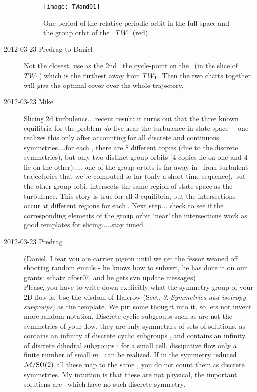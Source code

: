 \begin{description}
\begin{figure}
\begin{center}
  \texttt{[image: TWand01]}
\end{center}
  \caption{
  One period of the relative periodic orbit  in the full
  space and the group orbit of the \reqv\ $TW_{1}$ (red).}
\label{fig:TWand01}
\end{figure}

\item[2012-03-23 Predrag to Daniel]  Not the closest, use as the 2nd
\template\ the cycle-point on the  \po\ (in the slice of
$TW_{1}$) which is the furthest away from $TW_{1}$. Then the
two charts together will give the optimal cover over the whole 
trajectory.

\item[2012-03-23 Mike~~] Slicing 2d turbulence....recent result: it turns
out that the three known equilibria for the problem \emph{do} live near
the turbulence in state space----one realizes this only after accounting
for all discrete and continuous symmetries....for each {\eqv}, there
are 8 different copies (due to the discrete symmetries), but only two
distinct group orbits (4 copies lie on one and 4 lie on the
other)..... one of the group orbits is far away in \statesp\ from
turbulent trajectories that we've computed so far (only a short time
sequence), but the other group orbit intersects the same region of state
space as the turbulence.  This story is true for all 3 equilibria, but
the intersections occur at different regions for each {\eqv}. Next
step... check to see if the corresponding elements of the group orbit
`near' the intersections work as good templates for slicing.....stay
tuned.

\item[2012-03-23 Predrag~~] (Daniel, I fear you are carrier pigeon until
we get the fessor weaned off shooting random emails - he knows how to
subvert, he has done it on our grants: schatz   afosr07, and he gets
svn update messages)
\\
Please, you have to write down explicitly what the symmetry group of your
2D flow is. Use the wisdom of
{Halcrow} (Sect. \emph{3. Symmetries and isotropy subgroups})
as the template. We put some thought into it, so lets not invent more
random notation. Discrete cyclic subgroups such as  are not the
symmetries of your flow, they are only symmetries of sets of solutions,
as  contains an infinity of discrete cyclic subgroups , and
 contains an infinity of discrete dihedral subgroups ; for a
small cell, dissipative flow only a finite number of small $m$ \eqva\ can
be realized. If in the symmetry reduced \statesp\ ${\cal M}/\textrm{SO}(2)$ all these
map to the same \eqv, you do not count them as discrete symmetries. My
intuition is that these are not physical, the important solutions are
\reqva\ which have no such discrete symmetry.


\end{description}
